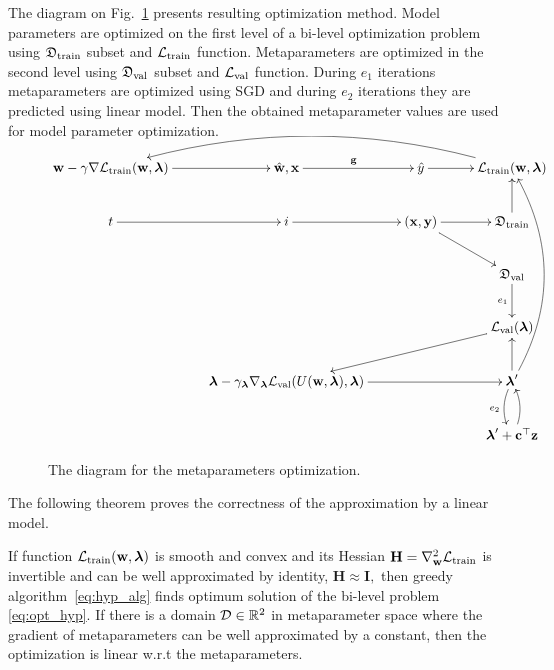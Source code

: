 \documentclass[runningheads]{llncs}
\begin{document}
The diagram on Fig.~\ref{fig:scheme} presents resulting optimization method. Model parameters are optimized on the first level of a bi-level optimization problem using $\mathfrak{D}_\text{train}$ subset and $\mathcal{L}_{\text{train}}$ function. Metaparameters are optimized in the second level using $\mathfrak{D}_\text{val}$ subset and $\mathcal{L}_\text{val}$ function. During $e_1$ iterations metaparameters are optimized using SGD and during $e_2$ iterations they are predicted using linear model. Then the obtained metaparameter values are used for model parameter optimization.
\begin{figure}
$$
\xymatrix{
\bw - \gamma\nabla\cL_\text{train}(\bw, \boldsymbol{\lambda})\ar[r] & \hat{\bw}, \bx\ar[r]^{\bg} & \hat{y}\ar[r] & \cL_\text{train}(\bw, \boldsymbol{\lambda})\ar@/_2pc/[lll]\\
t\ar[r] & i\ar[r] & (\bx, \by)\ar[r]\ar[dr] & \fD_\text{train}\ar[u]\\
 &  &  & \fD_\text{val}\ar[d]_{e_1}\\
 &  &  & \cL_{\text{val}}(\boldsymbol{\lambda})\ar[dll]\\
 & \boldsymbol{\lambda} - \gamma_{\boldsymbol{\lambda}}\nabla_{\boldsymbol{\lambda}}\cL_\text{val}(U(\bw, \boldsymbol{\lambda}), \boldsymbol{\lambda})\ar[rr] &  & \boldsymbol{\lambda}^\prime\ar[u]\ar@/_0.5pc/[d]_{e_2}\ar@/_2pc/[uuuu]\\
 &  &  & \boldsymbol{\lambda}^\prime + \bc^\T\textbf{z}\ar@/_0.5pc/[u]
}
$$
\caption{The diagram for the metaparameters optimization.}
\label{fig:scheme}

\end{figure}



\noindent
The following theorem proves the correctness of the  approximation by a linear model.

\begin{theorem}
If function $\mathcal{L}_{\textnormal{train}}(\mathbf{w}, \boldsymbol{\lambda})$ is smooth and convex and its Hessian $\mathbf{H} = \nabla_{\mathbf{w}}^2 \mathcal{L}_\textnormal{train}$  is invertible and can be well approximated by identity, $\mathbf{H} \approx \mathbf{I},$ then greedy algorithm~\eqref{eq:hyp_alg} finds optimum solution of the bi-level problem \eqref{eq:opt_hyp}. If there is a domain $\mathcal{D} \in \mathbb{R}^2$ in metaparameter space where the gradient of metaparameters can be well approximated by a constant, then the optimization is linear w.r.t the metaparameters.
\end{theorem}
\end{document}
